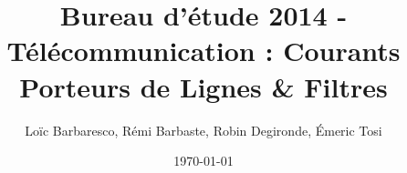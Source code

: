 \documentclass[a4paper,11pt]{report}
\title{Bureau d'étude 2014 - Télécommunication : Courants Porteurs de Lignes \& Filtres}{Courants Porteurs de Lignes \& Filtres}
\author{Loïc Barbaresco, Rémi Barbaste, Robin Degironde, Émeric Tosi}
\date{\today}
\begin{document}
    \maketitle{}



    \setcounter{tocdepth}{1} %
    \renewcommand{\contentsname}{Sommaire} %
    \tableofcontents{} %
    \clearpage


    
    \clearpage
    
    \clearpage

    
    \clearpage

    \listoffigures
    \clearpage
\end{document}
